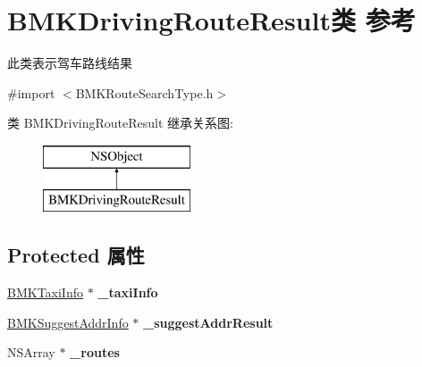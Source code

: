 \hypertarget{interface_b_m_k_driving_route_result}{\section{B\+M\+K\+Driving\+Route\+Result类 参考}
\label{interface_b_m_k_driving_route_result}
}


此类表示驾车路线结果  




{\ttfamily \#import $<$B\+M\+K\+Route\+Search\+Type.\+h$>$}

类 B\+M\+K\+Driving\+Route\+Result 继承关系图\+:\begin{figure}[H]
\begin{center}
\leavevmode
\includegraphics[height=2.000000cm]{interface_b_m_k_driving_route_result}
\end{center}
\end{figure}
\subsection*{Protected 属性}
\begin{DoxyCompactItemize}
\item 
\hypertarget{interface_b_m_k_driving_route_result_ad4dfb5abdc9df74cda947b4796879a13}{\hyperlink{interface_b_m_k_taxi_info}{B\+M\+K\+Taxi\+Info} $\ast$ {\bfseries \+\_\+taxi\+Info}}\label{interface_b_m_k_driving_route_result_ad4dfb5abdc9df74cda947b4796879a13}

\item 
\hypertarget{interface_b_m_k_driving_route_result_a7401197c1f543949165707362be5fcbb}{\hyperlink{interface_b_m_k_suggest_addr_info}{B\+M\+K\+Suggest\+Addr\+Info} $\ast$ {\bfseries \+\_\+suggest\+Addr\+Result}}\label{interface_b_m_k_driving_route_result_a7401197c1f543949165707362be5fcbb}

\item 
\hypertarget{interface_b_m_k_driving_route_result_a3a5b54ae9219585248392bbeaa5d9c42}{N\+S\+Array $\ast$ {\bfseries \+\_\+routes}}\label{interface_b_m_k_driving_route_result_a3a5b54ae9219585248392bbeaa5d9c42}

\end{DoxyCompactItemize}
